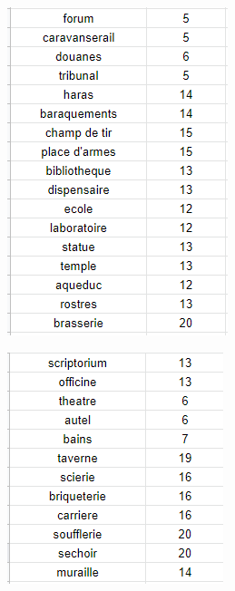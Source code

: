 \documentclass[12pt]{article}
\begin{document}
\begin{figure}[htbp]
\begin{subfigure}{.3\textwidth}
                \includegraphics[width=.9\linewidth]{images/notation_cartes2.PNG}
    	    \end{subfigure}
    	    \begin{subfigure}{.3\textwidth}
                \includegraphics[width=1.1\linewidth]{images/notation_cartes3.PNG}

\end{subfigure}
\end{figure}
\end{document}

